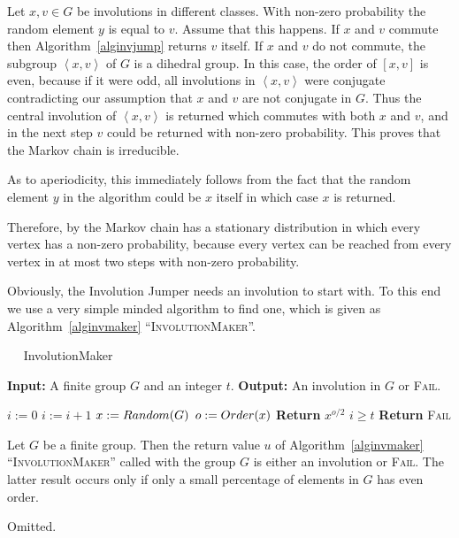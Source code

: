 Let $x,v \in G$ be involutions in different classes. With non-zero 
probability the random element $y$ is equal to $v$. Assume that this
happens. If $x$ and $v$
commute then Algorithm~\ref{alginvjump} returns $v$ itself. 
If $x$ and $v$ do not commute, the subgroup
$\left< x,v \right>$ of $G$ is a dihedral group. In this case, the
order of $[x,v]$ is even, because if it were odd, all involutions
in $\left< x,v \right>$ were conjugate contradicting our assumption
that $x$ and $v$ are not conjugate in $G$. Thus the
central involution of $\left< x,v \right>$ is returned which commutes
with both $x$ and $v$, and in the next step $v$ could be returned with
non-zero probability. This proves that the Markov chain is
irreducible.

As to aperiodicity, this immediately follows from the fact that the
random element $y$ in the algorithm could be $x$ itself in which case
$x$ is returned.

Therefore, by \cite[Theorem 2.2.1]{Ser} the Markov chain has a
stationary distribution in which every vertex has a non-zero
probability, because every vertex can be reached from every vertex in
at most two steps with non-zero probability.
\proofend

\smallskip
Obviously, the Involution Jumper needs an
involution to start with. To this end we use a very simple minded
algorithm to find one, which is given as Algorithm~\ref{alginvmaker}
``\textsc{InvolutionMaker}''.

\begin{algorithm}
\caption{$\quad$ \sc InvolutionMaker}
%
\label{alginvmaker}
\begin{algorithmic}
\STATE \textbf{Input:} A finite group $G$ and an integer $t$.
\STATE \textbf{Output:} An involution in $G$ or \textsc{Fail}.

\smallskip
\STATE $i := 0$
\REPEAT
    \STATE $i := i + 1$
    \STATE $x := \textsc{Random}(G)$ \hspace*{10mm} 
    \STATE $o := \textsc{Order}(x)$
        \STATE \textbf{Return} $x^{o/2}$
    \ENDIF
\UNTIL $i \ge t$
\STATE \textbf{Return} \textsc{Fail}
\end{algorithmic}
\end{algorithm}

\begin{Prop}
Let $G$ be a finite group. Then the return value $u$ of 
Algorithm~\ref{alginvmaker} ``\textsc{InvolutionMaker}'' 
called with the group $G$ is either
an involution or \textsc{Fail}. The latter result occurs only if
only a small percentage of elements in $G$ has even order.
\end{Prop}
\proofbeg Omitted.
\proofend


